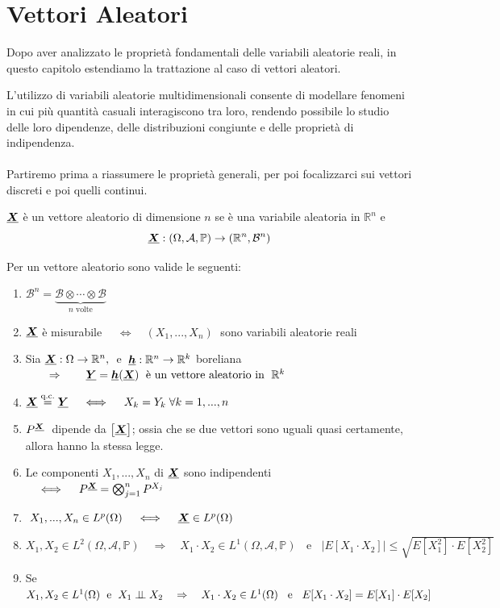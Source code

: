 \chapter{Vettori Aleatori}

Dopo aver analizzato le proprietà fondamentali delle variabili aleatorie reali, 
in questo capitolo estendiamo la trattazione al caso di vettori aleatori.

\medskip
\noindent L'utilizzo di variabili aleatorie multidimensionali consente di modellare 
fenomeni in cui più quantità casuali interagiscono tra loro, rendendo possibile lo studio delle loro dipendenze, delle distribuzioni congiunte e delle proprietà di indipendenza.\\
\\
Partiremo prima a riassumere le proprietà generali, per poi focalizzarci sui vettori discreti e poi quelli continui.

\begin{definizione}
    $\underline{{\boldsymbol{X}}}$ è un vettore aleatorio di dimensione $n$ se è una variabile aleatoria in $\mathbb{R}^n$ e 
    \[\underline{{\boldsymbol{X}}}:(\Omega, \mathcal{A}, \mathbb{P})\to (\mathbb{R}^n, \mathcal{B}^n)\]
\end{definizione}

\begin{teorema}
    Per un vettore aleatorio sono valide le seguenti:
    \begin{enumerate}
        \item $\mathcal{B}^n = \underbrace{\mathcal{B}\otimes\cdots\otimes \mathcal{B}}_{n \text{ volte}}$
        \item $\underline{{\boldsymbol{X}}}$ è misurabile $\quad \iff \quad (X_1, ..., X_n)\;$ sono variabili aleatorie reali
        \item Sia $\underline{{\boldsymbol{X}}}:\Omega\to\mathbb{R}^n,\;$ e $\;\underline{{\boldsymbol{h}}}:\mathbb{R}^n\to\mathbb{R}^k$ boreliana \(\qquad \Rightarrow\qquad \underline{{\boldsymbol{Y}}} = \underline{{\boldsymbol{h}}}(\underline{{\boldsymbol{X}}})\; \text{ è un vettore aleatorio in }\;\mathbb{R}^k\)
        \item $\underline{{\boldsymbol{X}}} \overset{\text{q.c.}}{=}\underline{{\boldsymbol{Y}}}\quad \iff \quad X_k = Y_k\;\forall k=1, ..., n$
        \item $P^{\underline{{\boldsymbol{X}}}}\;$ dipende da $\bigl[\underline{{\boldsymbol{X}}}\bigr]$; ossia che se due vettori sono uguali quasi certamente, allora hanno la stessa legge.
        \item Le componenti $X_1, ..., X_n$ di $\underline{{\boldsymbol{X}}}$ sono indipendenti $\quad \iff \quad P^{\underline{{\boldsymbol{X}}}} = \bigotimes_{j = 1}^n P^{X_j}$
        \item $\;X_1, ..., X_n\in L^p(\Omega)\quad \iff\quad \underline{{\boldsymbol{X}}} \in L^p(\Omega)\;$ 
        \item $X_1, X_2 \in L^2(\Omega, \mathcal{A}, \mathbb{P})\quad \Rightarrow\quad X_1\cdot X_2 \in L^1(\Omega, \mathcal{A}, \mathbb{P})\;\;\text{ e }\;\;\bigl|E[X_1\cdot X_2]\bigr|\leq \sqrt{E[X_1^2]\cdot E[X_2^2]}$
        \item Se $X_1, X_2 \in L^1(\Omega)\;\text{ e }\; X_1\mathrel{\perp\!\!\!\perp} X_2\quad \Rightarrow\quad X_1\cdot X_2\in L^1(\Omega)\;\; \text{ e }\;\; E[X_1\cdot X_2] = E[X_1]\cdot E[X_2]$
    \end{enumerate}
\end{teorema}

